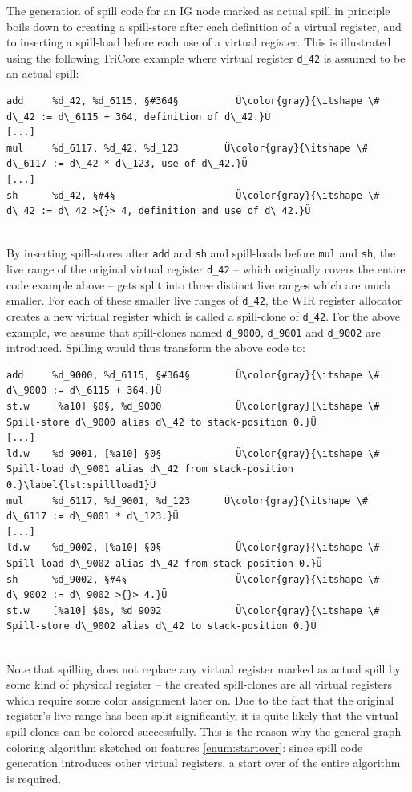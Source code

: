 The generation of spill code for an \gls{IG} node marked as actual spill in principle boils down to creating a spill-store after each definition of a virtual register, and to inserting a spill-load before each use of a virtual register.
This is illustrated using the following TriCore example where virtual register \texttt{d\_42} is assumed to be an actual spill: \\
\begin{lstlisting}[style=code,float=!ht,aboveskip=-0.8 \baselineskip,belowskip=-0.8 \baselineskip]
add     %d_42, %d_6115, §#364§          Ü\color{gray}{\itshape \# d\_42 := d\_6115 + 364, definition of d\_42.}Ü
[...]
mul     %d_6117, %d_42, %d_123        Ü\color{gray}{\itshape \# d\_6117 := d\_42 * d\_123, use of d\_42.}Ü
[...]
sh      %d_42, §#4§                     Ü\color{gray}{\itshape \# d\_42 := d\_42 >{}> 4, definition and use of d\_42.}Ü
\end{lstlisting}
\\
By inserting spill-stores after \texttt{add} and \texttt{sh} and spill-loads before \texttt{mul} and \texttt{sh}, the live range of the original virtual register \texttt{d\_42} -- which originally covers the entire code example above -- gets split into three distinct live ranges which are much smaller.
For each of these smaller live ranges of \texttt{d\_42}, the \gls{WIR} register allocator creates a new virtual register which is called a spill-clone of \texttt{d\_42}.
For the above example, we assume that spill-clones named \texttt{d\_9000}, \texttt{d\_9001} and \texttt{d\_9002} are introduced.
Spilling would thus transform the above code to: \\
\begin{lstlisting}[style=code,float=!ht,aboveskip=-0.8 \baselineskip,belowskip=-0.8 \baselineskip]
add     %d_9000, %d_6115, §#364§        Ü\color{gray}{\itshape \# d\_9000 := d\_6115 + 364.}Ü
st.w    [%a10] §0§, %d_9000             Ü\color{gray}{\itshape \# Spill-store d\_9000 alias d\_42 to stack-position 0.}Ü
[...]
ld.w    %d_9001, [%a10] §0§             Ü\color{gray}{\itshape \# Spill-load d\_9001 alias d\_42 from stack-position 0.}\label{lst:spillload1}Ü
mul     %d_6117, %d_9001, %d_123      Ü\color{gray}{\itshape \# d\_6117 := d\_9001 * d\_123.}Ü
[...]
ld.w    %d_9002, [%a10] §0§             Ü\color{gray}{\itshape \# Spill-load d\_9002 alias d\_42 from stack-position 0.}Ü
sh      %d_9002, §#4§                   Ü\color{gray}{\itshape \# d\_9002 := d\_9002 >{}> 4.}Ü
st.w    [%a10] $0$, %d_9002             Ü\color{gray}{\itshape \# Spill-store d\_9002 alias d\_42 to stack-position 0.}Ü
\end{lstlisting}
\\
Note that spilling does not replace any virtual register marked as actual spill by some kind of physical register -- the created spill-clones are all virtual registers which require some color assignment later on.
Due to the fact that the original register's live range has been split significantly, it is quite likely that the virtual spill-clones can be colored successfully.
This is the reason why the general graph coloring algorithm sketched on  features \cref{enum:startover}: since spill code generation introduces other virtual registers, a start over of the entire algorithm is required.

